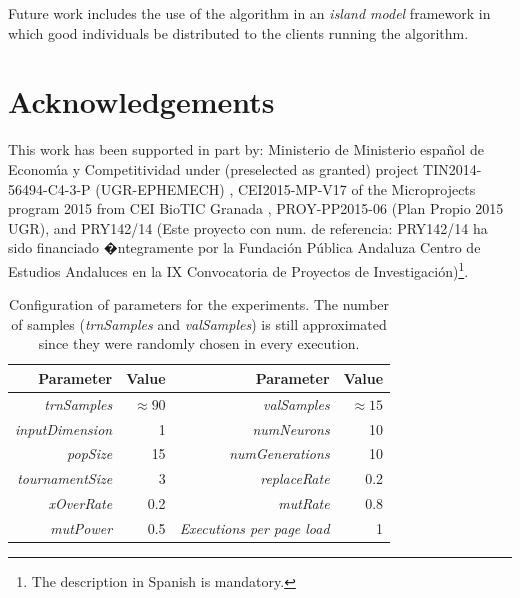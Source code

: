 \documentclass{article}
\begin{document}
Future work includes the use of the
algorithm in an {\em island model}  framework in which good
individuals be distributed to the clients running the algorithm.



\section*{Acknowledgements}
 This work has been supported in part by:
 Ministerio de Ministerio espa\~{n}ol de Econom\'{\i}a y Competitividad under (preselected as granted) project TIN2014-56494-C4-3-P (UGR-EPHEMECH)
 , CEI2015-MP-V17 of the Microprojects program 2015 from CEI BioTIC Granada
 , PROY-PP2015-06 (Plan Propio 2015 UGR),
 and
 PRY142/14 (Este proyecto con num. de referencia: PRY142/14 ha sido financiado �ntegramente por la Fundaci\'{o}n P\'{u}blica Andaluza Centro de Estudios Andaluces en la IX Convocatoria de Proyectos de Investigaci\'{o}n)\footnote{The description in Spanish is mandatory.}.


%
%




\newpage
\setlength{\tabcolsep}{10pt}
\begin{table}
\caption{Configuration of parameters for the experiments. The number of samples ({\em trnSamples} and {\em valSamples}) is still approximated since they were randomly chosen in every execution.}
\label{tab:parameters-experiments}
\begin{center}
\begin{tabular}{rr|rr}
{\bf Parameter} & {\bf Value} &
{\bf Parameter} & {\bf Value}\\
\hline
{\em trnSamples} & $\approx 90$ &
{\em valSamples} & $\approx 15$  \\
{\em inputDimension} &   1 &
{\em numNeurons} &  10 \\
{\em popSize} &  15 &
{\em numGenerations} & 10  \\
{\em tournamentSize} &  3 &
{\em replaceRate} &   0.2 \\
{\em xOverRate} &  0.2&
{\em mutRate} &   0.8  \\
{\em mutPower} &  0.5 &
{\em Executions per page load} & 1 \\
\hline
\end{tabular}
\end{center}
\end{table}
\end{document}
